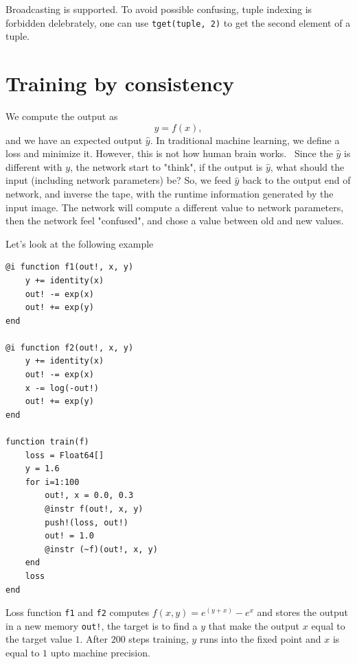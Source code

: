 \documentclass[aps,twocolumn,longbibliography,english,superscriptaddress,prr]{revtex4-1}
\newcommand{\<}{\langle}
\renewcommand{\>}{\rangle}
\theoremstyle{definition}\newtheorem{definition}{\textit{Definition}}
\begin{document}
Broadcasting is supported. To avoid possible confusing, tuple indexing is forbidden delebrately, one can use \texttt{tget(tuple, 2)} to get the second element of a tuple.

\section{Training by consistency}\label{sec:train}
We compute the output as
\begin{equation}
    y = f(x),
\end{equation}
and we have an expected output $\hat{y}$. In traditional machine learning, we define a loss and minimize it. However, this is not how human brain works.~\cite{Hintoncomment}
Since the $\hat{y}$ is different with $y$, the network start to "think", if the output is $\hat{y}$, what should the input (including network parameters) be?
So, we feed $\hat{y}$ back to the output end of network, and inverse the tape, with the runtime information generated by the input image. The network will compute a different value to network parameters, then the network feel "confused", and chose a value between old and new values.

Let's look at the following example
\begin{minipage}{.44\textwidth}
\begin{lstlisting}[basicstyle=\small\ttfamily,columns=fullflexible]
@i function f1(out!, x, y)
    y += identity(x)
    out! -= exp(x)
    out! += exp(y)
end

@i function f2(out!, x, y)
    y += identity(x)
    out! -= exp(x)
    x -= log(-out!)
    out! += exp(y)
end

function train(f)
    loss = Float64[]
    y = 1.6
    for i=1:100
        out!, x = 0.0, 0.3
        @instr f(out!, x, y)
        push!(loss, out!)
        out! = 1.0
        @instr (~f)(out!, x, y)
    end
    loss
end
\end{lstlisting}
\end{minipage}

Loss function \texttt{f1} and \texttt{f2} computes $f(x, y) = e^{(y+x)} - e^x$ and stores the output in a new memory \texttt{out!}, the target is to find a $y$ that make the output $x$ equal to the target value $1$.
After $200$ steps training, $y$ runs into the fixed point and $x$ is equal to $1$ upto machine precision.
\end{document}
